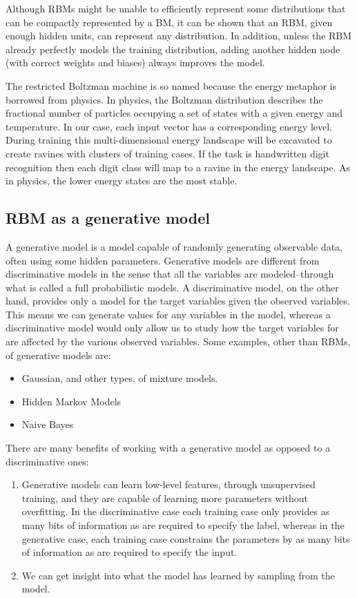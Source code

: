 \documentclass[11pt]{article}
\begin{document}
Although RBMs might be unable to efficiently represent some distributions that can be compactly represented by a BM, it can be shown that an RBM, given enough hidden units, can represent any distribution\cite{le08}.  In addition, unless the RBM already perfectly models the training distribution, adding another hidden node (with correct weights and biases) always improves the model\cite{le08}.

The restricted Boltzman machine is so named because the energy metaphor is borrowed from physics.  In physics, the Boltzman distribution describes the fractional number of particles occupying a set of states with a given energy and temperature.  In our case, each input vector has a corresponding energy level.  During training this multi-dimensional energy landscape will be excavated to create ravines with clusters of training cases.  If the task is handwritten digit recognition then each digit class will map to a ravine in the energy landscape.  As in physics, the lower energy states are the most stable.

\subsection{RBM as a generative model}

A generative model is a model capable of randomly generating observable data, often using some hidden parameters.  Generative models are different from discriminative models in the sense that all the variables are modeled--through what is called a full probabilistic models.  A discriminative model, on the other hand, provides only a model for the target variables given the observed variables.  This means we can generate values for any variables in the model, whereas a discriminative model would only allow us to study how the target variables for are affected by the various observed variables.  Some examples, other than RBMs, of generative models are:

\begin{itemize}
 \item Gaussian, and other types, of mixture models.
 \item Hidden Markov Models
 \item Naive Bayes
\end{itemize}

There are many benefits of working with a generative model as opposed to a discriminative ones:

\begin{enumerate}
\item Generative models can learn low-level features, through unsupervised training, and they are capable of learning more parameters without overfitting.  In the discriminative case each training case only provides as many bits of information as are required to specify the label\cite{hinton06}, whereas in the generative case, each training case constrains the parameters by as many bits of information as are required to specify the input.
\item We can get insight into what the model has learned by sampling from the model.
\end{enumerate}
\end{document}
